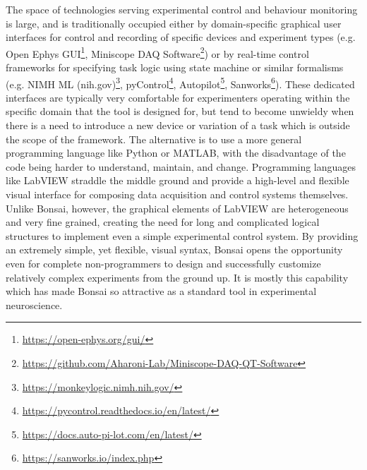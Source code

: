 The space of technologies serving experimental control and behaviour monitoring
is large, and is traditionally occupied either by domain-specific graphical
user interfaces for control and recording of specific devices and experiment
types (e.g. Open Ephys
GUI\footnote{\href{https://open-ephys.org/gui/}{https://open-ephys.org/gui/}},
Miniscope DAQ
Software\footnote{\href{https://github.com/Aharoni-Lab/Miniscope-DAQ-QT-Software}{https://github.com/Aharoni-Lab/Miniscope-DAQ-QT-Software}})
or by real-time control frameworks for specifying task logic using state
machine or similar formalisms (e.g. NIMH ML
(nih.gov)\footnote{\href{https://monkeylogic.nimh.nih.gov/}{https://monkeylogic.nimh.nih.gov/}},
pyControl\footnote{\href{https://pycontrol.readthedocs.io/en/latest/}{https://pycontrol.readthedocs.io/en/latest/}},
Autopilot\footnote{\href{https://docs.auto-pi-lot.com/en/latest/}{https://docs.auto-pi-lot.com/en/latest/}},
Sanworks\footnote{\href{https://sanworks.io/index.php}{https://sanworks.io/index.php}}).
These dedicated interfaces are typically very comfortable for experimenters
operating within the specific domain that the tool is designed for, but tend to
become unwieldy when there is a need to introduce a new device or variation of
a task which is outside the scope of the framework. The alternative is to use a
more general programming language like Python or MATLAB, with the disadvantage
of the code being harder to understand, maintain, and change. Programming
languages like LabVIEW straddle the middle ground and provide a high-level and
flexible visual interface for composing data acquisition and control systems
themselves. Unlike Bonsai, however, the graphical elements of LabVIEW are
heterogeneous and very fine grained, creating the need for long and complicated
logical structures to implement even a simple experimental control system. By
providing an extremely simple, yet flexible, visual syntax, Bonsai opens the
opportunity even for complete non-programmers to design and successfully
customize relatively complex experiments from the ground up. It is mostly this
capability which has made Bonsai so attractive as a standard tool in
experimental neuroscience.


